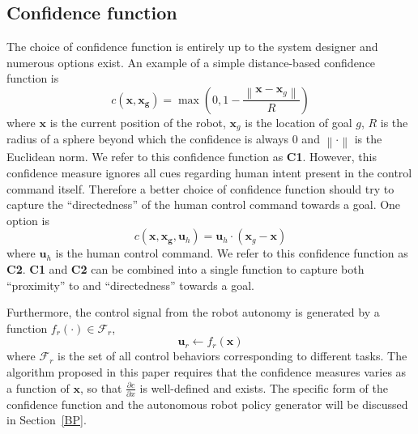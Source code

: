 \documentclass[conference]{IEEEtran}
\newcommand{\norm}[1]{\left\lVert#1\right\rVert}
\begin{document}
\subsection{Confidence function}\label{CF}
The choice of confidence function is entirely up to the system designer and numerous options exist. An example of a simple distance-based confidence function is
\begin{equation*}\label{EQ1}
c(\boldsymbol{x}, \boldsymbol{x_g}) = \max(0, 1 - \frac{\norm{\boldsymbol{x} - \boldsymbol{x}_{g}}}{R})
\end{equation*}
where $\boldsymbol{x}$ is the current position of the robot, $\boldsymbol{x}_{g}$ is the location of goal $g$, $R$ is the radius of a sphere beyond which the confidence is always $0$ and $\norm{\cdot}$ is the Euclidean norm. We refer to this confidence function as \textbf{C1}. However, this confidence measure ignores all cues regarding human intent present in the control command itself. Therefore a better choice of confidence function should try to capture the ``directedness'' of the human control command towards a goal. One option is
\begin{equation*}\label{EQ2}
c({\boldsymbol{x},\boldsymbol{x_g}, \boldsymbol{u}_{h}}) = \boldsymbol{u}_h\cdot(\boldsymbol{x}_{g} - \boldsymbol{x})
\end{equation*}
where $\boldsymbol{u}_h$ is the human control command. We refer to this confidence function as \textbf{C2}. \textbf{C1} and \textbf{C2} can be combined into a single function to capture both ``proximity'' to and ``directedness'' towards a goal.

Furthermore, the control signal from the robot autonomy is generated by a function $f_{r}(\cdot) \in \mathcal{F}_{r}$, 
\begin{equation*}
\boldsymbol{u}_r \leftarrow f_{r}(\boldsymbol{x})
\end{equation*}
where $\mathcal{F}_{r}$ is the set of all control behaviors corresponding to different tasks. The algorithm proposed in this paper requires that the confidence measures varies as a function of $\boldsymbol{x}$, so that $\frac{\partial c}{\partial x}$ is well-defined and exists. The specific form of the confidence function and the autonomous robot policy generator will be discussed in Section~\ref{BP}.
\end{document}
